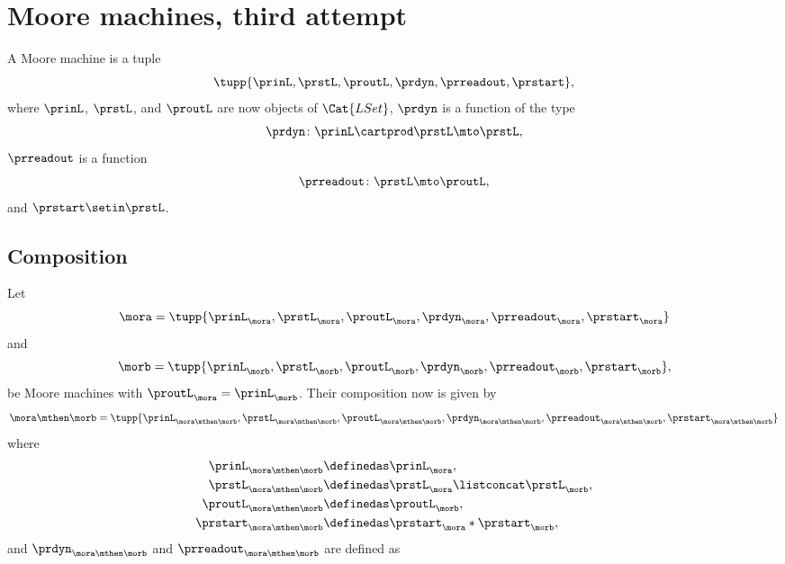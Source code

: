 
\section{Moore machines, third attempt}

\begin{definition}
    \label{def:moore_machine_3rd}
    A Moore machine is a tuple
    \begin{equation}
        \label{eq:moore-tuple-improved-again}
        \tupp{\prinL,\prstL,\proutL,\prdyn,\prreadout,\prstart},
    \end{equation}
    where $\prinL$, $\prstL$, and $\proutL$ are now objects of $\Cat{LSet}$, $\prdyn$ is a function of the type
    \begin{equation}
        \prdyn \colon \prinL \cartprod \prstL \mto \prstL,
    \end{equation}
    $\prreadout$ is a function
    \begin{equation}
        \prreadout \colon \prstL \mto \proutL,
    \end{equation}
    and $\prstart \setin \prstL$.
\end{definition}


\subsection{Composition}

Let   
\begin{equation}
    \label{eq:moore-mora-3rd}
    \mora = \tupp{\prinL_{\mora},\prstL_{\mora},\proutL_{\mora},\prdyn_{\mora},\prreadout_{\mora},\prstart_{\mora}}
\end{equation}
%
and
%
\begin{equation}
    \label{eq:moore-morb-3rd}
    \morb = \tupp{\prinL_{\morb},\prstL_{\morb},\proutL_{\morb},\prdyn_{\morb},\prreadout_{\morb},\prstart_{\morb}},
\end{equation}
be Moore machines with $\proutL_{\mora} = \prinL_{\morb}$. Their composition now is given by 
\begin{equation}
    \mora \mthen \morb = \tupp{\prinL_{\mora \mthen \morb},\prstL_{\mora \mthen \morb},\proutL_{\mora \mthen \morb},\prdyn_{\mora \mthen \morb},\prreadout_{\mora \mthen \morb},\prstart_{\mora \mthen \morb}}
\end{equation}
where
%
\begin{equation}
    \label{eq:moore-comp-3rd-1}
    \begin{aligned}
        \prinL_{\mora\mthen\morb}    & \definedas \prinL_{\mora}, \\
        \prstL_{\mora\mthen\morb}   & \definedas \prstL_{\mora} \listconcat  \prstL_{\morb}, \\
        \proutL_{\mora\mthen\morb}   & \definedas \proutL_{\morb}, \\
        \prstart_{\mora\mthen\morb} & \definedas \prstart_{\mora} * \prstart_{\morb},
    \end{aligned}
\end{equation}
and $\prdyn_{\mora \mthen \morb}$ and $\prreadout_{\mora \mthen \morb}$ are defined as 

